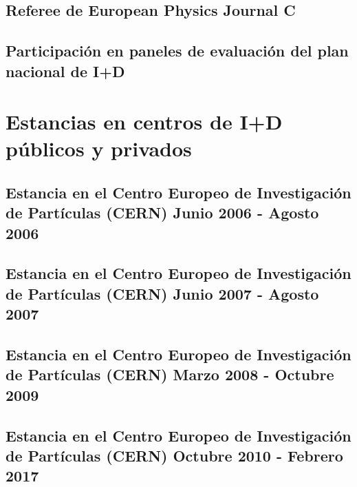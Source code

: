 \documentclass[a4paper, 11pt, twoside, openright]{report}
\begin{document}
\subsection{Referee de European Physics Journal C}


\subsection{Participación en paneles de evaluación del plan nacional de I+D}



\section{Estancias en centros de I+D públicos y privados}
\subsection{Estancia en el Centro Europeo de Investigación de Partículas (CERN) Junio 2006 - Agosto 2006}

\subsection{Estancia en el Centro Europeo de Investigación de Partículas (CERN) Junio 2007 - Agosto 2007}

\subsection{Estancia en el Centro Europeo de Investigación de Partículas (CERN) Marzo 2008 - Octubre 2009}

\subsection{Estancia en el Centro Europeo de Investigación de Partículas (CERN) Octubre 2010 - Febrero 2017}

\end{document}
